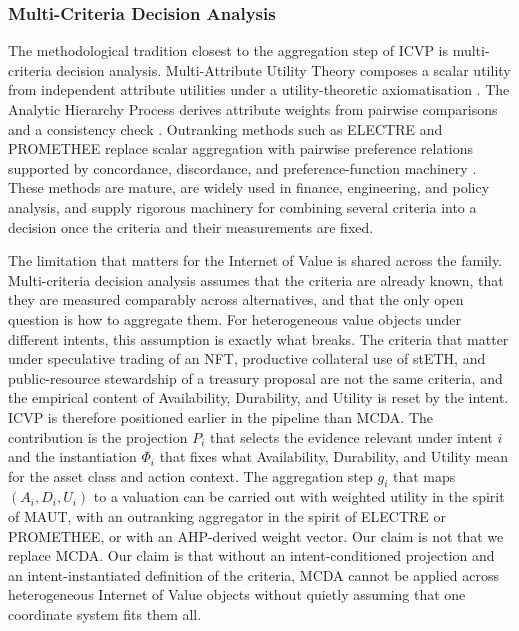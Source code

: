 \subsubsection{Multi-Criteria Decision Analysis}

The methodological tradition closest to the aggregation step of ICVP is
multi-criteria decision analysis. Multi-Attribute Utility Theory composes a
scalar utility from independent attribute utilities under a utility-theoretic
axiomatisation \cite{Keeney1976}. The Analytic Hierarchy Process derives
attribute weights from pairwise comparisons and a consistency check
\cite{Saaty1980}. Outranking methods such as ELECTRE and PROMETHEE replace
scalar aggregation with pairwise preference relations supported by
concordance, discordance, and preference-function machinery
\cite{Roy1991,Brans1986}. These methods are mature, are widely used in
finance, engineering, and policy analysis, and supply rigorous machinery for
combining several criteria into a decision once the criteria and their
measurements are fixed.

The limitation that matters for the Internet of Value is shared across the
family. Multi-criteria decision analysis assumes that the criteria are
already known, that they are measured comparably across alternatives, and
that the only open question is how to aggregate them. For heterogeneous
value objects under different intents, this assumption is exactly what
breaks. The criteria that matter under speculative trading of an NFT,
productive collateral use of stETH, and public-resource stewardship of a
treasury proposal are not the same criteria, and the empirical content of
Availability, Durability, and Utility is reset by the intent. ICVP is
therefore positioned earlier in the pipeline than MCDA. The contribution is
the projection $P_i$ that selects the evidence relevant under intent $i$ and
the instantiation $\Phi_i$ that fixes what Availability, Durability, and
Utility mean for the asset class and action context. The aggregation step
$g_i$ that maps $(A_i, D_i, U_i)$ to a valuation can be carried out with
weighted utility in the spirit of MAUT, with an outranking aggregator in the
spirit of ELECTRE or PROMETHEE, or with an AHP-derived weight vector. Our
claim is not that we replace MCDA. Our claim is that without an
intent-conditioned projection and an intent-instantiated definition of the
criteria, MCDA cannot be applied across heterogeneous Internet of Value
objects without quietly assuming that one coordinate system fits them all.

